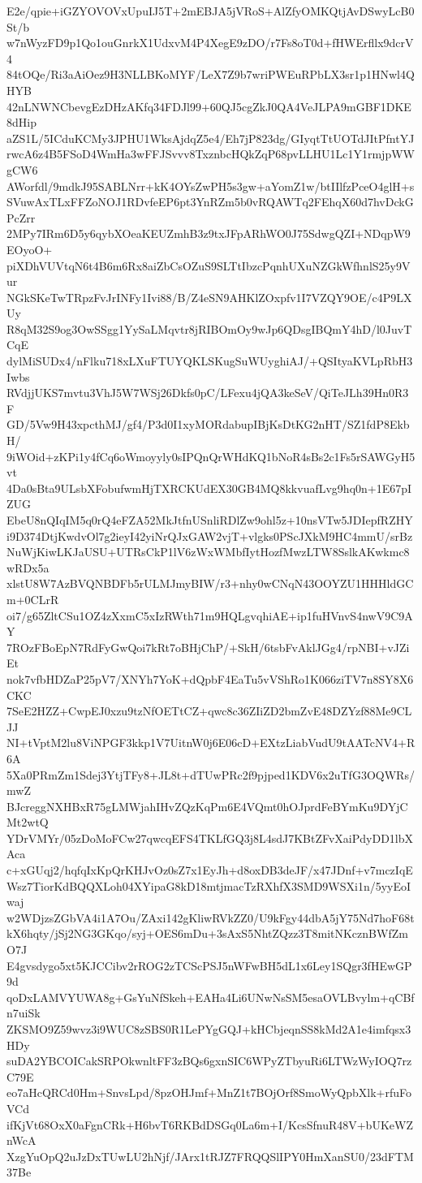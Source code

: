 E2e/qpie+iGZYOVOVxUpuIJ5T+2mEBJA5jVRoS+AlZfyOMKQtjAvDSwyLcB0St/b
w7nWyzFD9p1Qo1ouGnrkX1UdxvM4P4XegE9zDO/r7Fs8oT0d+fHWErfllx9dcrV4
84tOQe/Ri3aAiOez9H3NLLBKoMYF/LeX7Z9b7wriPWEuRPbLX3sr1p1HNwl4QHYB
42nLNWNCbevgEzDHzAKfq34FDJl99+60QJ5cgZkJ0QA4VeJLPA9mGBF1DKE8dHip
aZS1L/5ICduKCMy3JPHU1WksAjdqZ5e4/Eh7jP823dg/GIyqtTtUOTdJItPfntYJ
rwcA6z4B5FSoD4WmHa3wFFJSvvv8TxznbcHQkZqP68pvLLHU1Lc1Y1rmjpWWgCW6
AWorfdl/9mdkJ95SABLNrr+kK4OYsZwPH5s3gw+aYomZ1w/btIIlfzPceO4glH+s
SVuwAxTLxFFZoNOJ1RDvfeEP6pt3YnRZm5b0vRQAWTq2FEhqX60d7hvDckGPcZrr
2MPy7IRm6D5y6qybXOeaKEUZmhB3z9txJFpARhWO0J75SdwgQZI+NDqpW9EOyoO+
piXDhVUVtqN6t4B6m6Rx8aiZbCsOZuS9SLTtIbzcPqnhUXuNZGkWfhnlS25y9Vur
NGkSKeTwTRpzFvJrINFy1Ivi88/B/Z4eSN9AHKlZOxpfv1I7VZQY9OE/c4P9LXUy
R8qM32S9og3OwSSgg1YySaLMqvtr8jRIBOmOy9wJp6QDsgIBQmY4hD/l0JuvTCqE
dylMiSUDx4/nFlku718xLXuFTUYQKLSKugSuWUyghiAJ/+QSItyaKVLpRbH3Iwbs
RVdjjUKS7mvtu3VhJ5W7WSj26Dkfs0pC/LFexu4jQA3keSeV/QiTeJLh39Hn0R3F
GD/5Vw9H43xpcthMJ/gf4/P3d0I1xyMORdabupIBjKsDtKG2nHT/SZ1fdP8EkbH/
9iWOid+zKPi1y4fCq6oWmoyyly0sIPQnQrWHdKQ1bNoR4sBs2c1Fs5rSAWGyH5vt
4Da0sBta9ULsbXFobufwmHjTXRCKUdEX30GB4MQ8kkvuafLvg9hq0n+1E67pIZUG
EbeU8nQIqIM5q0rQ4eFZA52MkJtfnUSnliRDlZw9ohl5z+10nsVTw5JDIepfRZHY
i9D374DtjKwdvOl7g2ieyI42yiNrQJxGAW2vjT+vlgks0PScJXkM9HC4mmU/srBz
NuWjKiwLKJaUSU+UTRsCkP1lV6zWxWMbfIytHozfMwzLTW8SslkAKwkmc8wRDx5a
xlstU8W7AzBVQNBDFb5rULMJmyBIW/r3+nhy0wCNqN43OOYZU1HHHldGCm+0CLrR
oi7/g65ZltCSu1OZ4zXxmC5xIzRWth71m9HQLgvqhiAE+ip1fuHVnvS4nwV9C9AY
7ROzFBoEpN7RdFyGwQoi7kRt7oBHjChP/+SkH/6tsbFvAklJGg4/rpNBI+vJZiEt
nok7vfbHDZaP25pV7/XNYh7YoK+dQpbF4EaTu5vVShRo1K066ziTV7n8SY8X6CKC
7SeE2HZZ+CwpEJ0xzu9tzNfOETtCZ+qwc8c36ZIiZD2bmZvE48DZYzf88Me9CLJJ
NI+tVptM2lu8ViNPGF3kkp1V7UitnW0j6E06cD+EXtzLiabVudU9tAATcNV4+R6A
5Xa0PRmZm1Sdej3YtjTFy8+JL8t+dTUwPRc2f9pjped1KDV6x2uTfG3OQWRs/mwZ
BJcreggNXHBxR75gLMWjahIHvZQzKqPm6E4VQmt0hOJprdFeBYmKu9DYjCMt2wtQ
YDrVMYr/05zDoMoFCw27qwcqEFS4TKLfGQ3j8L4sdJ7KBtZFvXaiPdyDD1lbXAca
c+xGUqj2/hqfqIxKpQrKHJvOz0sZ7x1EyJh+d8oxDB3deJF/x47JDnf+v7mczIqE
Wsz7TiorKdBQQXLoh04XYipaG8kD18mtjmacTzRXhfX3SMD9WSXi1n/5yyEoIwaj
w2WDjzsZGbVA4i1A7Ou/ZAxi142gKliwRVkZZ0/U9kFgy44dbA5jY75Nd7hoF68t
kX6hqty/jSj2NG3GKqo/syj+OES6mDu+3sAxS5NhtZQzz3T8mitNKcznBWfZmO7J
E4gvsdygo5xt5KJCCibv2rROG2zTCScPSJ5nWFwBH5dL1x6Ley1SQgr3fHEwGP9d
qoDxLAMVYUWA8g+GsYuNfSkeh+EAHa4Li6UNwNsSM5esaOVLBvylm+qCBfn7uiSk
ZKSMO9Z59wvz3i9WUC8zSBS0R1LePYgGQJ+kHCbjeqnSS8kMd2A1e4imfqsx3HDy
suDA2YBCOICakSRPOkwnltFF3zBQs6gxnSIC6WPyZTbyuRi6LTWzWyIOQ7rzC79E
eo7aHcQRCd0Hm+SnvsLpd/8pzOHJmf+MnZ1t7BOjOrf8SmoWyQpbXlk+rfuFoVCd
ifKjVt68OxX0aFgnCRk+H6bvT6RKBdDSGq0La6m+I/KcsSfnuR48V+bUKeWZnWcA
XzgYuOpQ2uJzDxTUwLU2hNjf/JArx1tRJZ7FRQQSlIPY0HmXanSU0/23dFTM37Be

